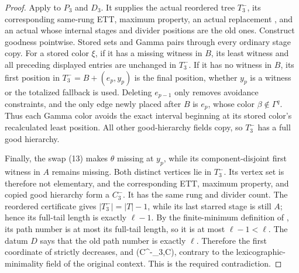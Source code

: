 \begin{proof}
Apply  to
\(P_3\) and \(D_3\).  It supplies the actual reordered tree \(T^-_3\),
its corresponding same-rung ETT, maximum property, an actual replacement
, and an actual 
whose internal stages and divider positions are the old ones.  Construct
goodness pointwise.  Stored sets and Gamma pairs through every ordinary
stage copy.  For a stored color \(\xi\), if it has a missing witness in
\(B\), its least witness and all preceding displayed entries are
unchanged in \(T^-_3\).  If it has no witness in \(B\), its first
position in \(T^-_3=B+(e_p,y_p)\) is the final position, whether \(y_p\)
is a witness or the totalized fallback is used.  Deleting
\(e_{p-1}\) only removes avoidance constraints, and the only edge newly
placed after \(B\) is \(e_p\), whose color
\(\beta\notin\Gamma^q\).  Thus each Gamma color avoids the exact interval
beginning at its stored color's recalculated least position.  All other
good-hierarchy fields copy, so \(T^-_3\) has a full good hierarchy.

Finally, the swap (13) makes \(\theta\) missing at \(y_p\), while its
component-disjoint first witness in \(A\) remains missing.  Both
distinct vertices lie in \(T^-_3\).  Its vertex set is therefore not
elementary, and the corresponding ETT, maximum property, and copied
good hierarchy form a  \(C^-_3\).
It has the same rung and divider count.  The reordered certificate gives
\(|T^-_3|=|T|-1\), while its last starred stage is still \(A\); hence its
full-tail length is exactly \(\ell-1\).  By the finite-minimum definition
of , its path number is at most its
full-tail length, so it is at most \(\ell-1<\ell\).  The datum \(D\)
says that the old path number is exactly \(\ell\).  Therefore the first
coordinate of  strictly
decreases, and
(C^-_3,C)\), contrary to the
lexicographic-minimality field of the original context.  This is the
required contradiction.
\end{proof}
